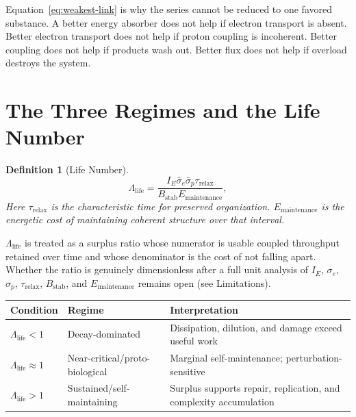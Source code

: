 \documentclass[11pt,a4paper]{article}
\newtheorem{definition}{Definition}
\begin{document}
Equation~\eqref{eq:weakest-link} is why the series cannot be reduced to one favored substance. A better energy absorber does not help if electron transport is absent. Better electron transport does not help if proton coupling is incoherent. Better coupling does not help if products wash out. Better flux does not help if overload destroys the system.

\section{The Three Regimes and the Life Number}

\begin{definition}[Life Number]
\begin{equation}
 \Lambda_{\mathrm{life}} =
 \frac{I_E \bar{\sigma}_e \bar{\sigma}_p \tau_{\mathrm{relax}}}
 {B_{\mathrm{stab}} E_{\mathrm{maintenance}}},
 \label{eq:life-number}
\end{equation}
Here $\tau_{\mathrm{relax}}$ is the characteristic time for preserved
organization. $E_{\mathrm{maintenance}}$ is the energetic cost of maintaining
coherent structure over that interval.
\end{definition}

$\Lambda_{\mathrm{life}}$ is treated as a surplus ratio whose numerator is usable coupled throughput retained over time and whose denominator is the cost of not falling apart. Whether the ratio is genuinely dimensionless after a full unit analysis of $I_E$, $\sigma_e$, $\sigma_p$, $\tau_{\mathrm{relax}}$, $B_{\mathrm{stab}}$, and $E_{\mathrm{maintenance}}$ remains open (see Limitations).

\begin{center}
\small
\begin{tabular}{p{}p{}p{}}
\toprule
Condition & Regime & Interpretation \\
\midrule
$\Lambda_{\mathrm{life}}<1$ & Decay-dominated & Dissipation, dilution, and damage exceed useful work \\
$\Lambda_{\mathrm{life}}\approx1$ & Near-critical/proto-biological & Marginal self-maintenance; perturbation-sensitive \\
$\Lambda_{\mathrm{life}}>1$ & Sustained/self-maintaining & Surplus supports repair, replication, and complexity accumulation \\
\bottomrule
\end{tabular}
\end{center}
\end{document}
